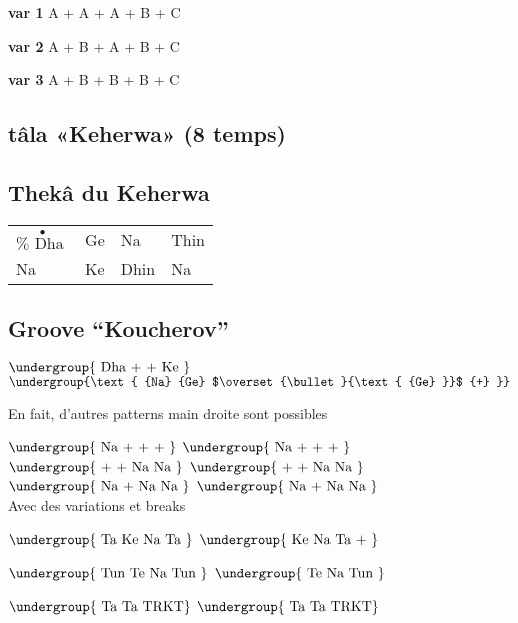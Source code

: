 \documentclass[12pt]{article}
\newcommand{\matra}[1]{$\undergroup{\text{#1}}$}
\newcommand{\press}[1]{$\overset{\bullet}{\text{#1}}$}
\newif\ifdoigt
\newcommand{\bol}[2]{%
  \ifdoigt
  \pbox[b]{2cm}
       {\hspace*{\fill}{\scriptsize #2}\\#1}
  \else
      {#1}
  \fi
}%
\def\Go{\bol{Ge}{1}}
\def\Gd{\bol{Ge}{2}}
\def\K{\bol{Ke}{}}
\def\Tt{\bol{Te}{g3}}
\def\N{\bol{Na}{k}}
\def\Ta{\bol{Ta}{k}}
\def\Thi{\bol{Thin}{s/k}}
\def\Tu{\bol{Tun}{}}
\def\Da{\bol{Dha}{k/2}}
\def\Di{\bol{Dhin}{gsn1/2}}
\def\sepnl{\\}
\def\cont{\bol{+}{}}
\begin{document}
\textbf{var 1}
A + A + A + B + C

\textbf{var 2}
A + B + A + B + C

\textbf{var 3}
A + B + B + B + C

\begin{framed}
  \section*{tâla «Keherwa» (8 temps)}
\end{framed}

\subsection*{Thekâ du \textbf{Keherwa}}

\begin{tabular}{llll}
  \press{\Da} & \Go & \N & \Thi \\
  \N & \K & \Di & \N
\end{tabular}

\begin{framed}
  \section*{Groove ``Koucherov''}
\end{framed}

\matra{\Da \cont \cont \K} \matra{\N\Gd\press{\Go}\cont}

En fait, d'autres patterns main droite sont possibles

\matra{\N \cont\cont\cont} \matra{\N \cont\cont\cont} \sepnl
\matra{\cont\cont \N\N} \matra{\cont\cont \N\N} \sepnl
\matra{\N \cont \N\N} \matra{\N \cont \N\N} \sepnl

Avec des variations et breaks

\matra{\Ta \K \N \Ta} \matra{\K \N \Ta \cont}

\matra{\Tu \Tt \N \Tu} \matra{\Tt \N \Tu \tt}

\matra{\Ta \Ta TRKT} \matra{\Ta \Ta TRKT} 



\end{document}
